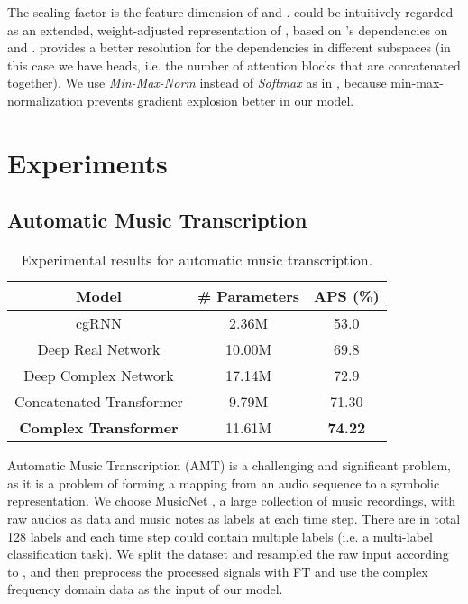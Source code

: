 \documentclass{article}
\begin{document}
The scaling factor  is the feature dimension of  and .  could be intuitively regarded as an extended, weight-adjusted representation of , based on 's dependencies on  and .   provides a better resolution for the dependencies in different subspaces \cite{tsaikernel} (in this case we have  heads, i.e. the number of attention blocks that are concatenated together). We use \textit{Min-Max-Norm} instead of \textit{Softmax} as in \cite{vaswani2017attention}, because min-max-normalization prevents gradient explosion better in our model.

\section{Experiments}

\subsection{Automatic Music Transcription}

\begin{table}
\centering
\caption{Experimental results for automatic music transcription.}
\begin{tabular}{c c c}
\toprule
 Model & \# Parameters & APS (\%)  \\
\midrule
cgRNN \cite{wolter2018complex} & 2.36M & 53.0 \\
Deep Real Network \cite{trabelsi2017deep} & 10.00M & 69.8 \\
Deep Complex Network \cite{trabelsi2017deep} & 17.14M & 72.9 \\
Concatenated Transformer & 9.79M & 71.30 \\
\textbf{Complex Transformer} & 11.61M & \textbf{74.22} \\
\bottomrule
\end{tabular}
\label{tab:result_music}
\end{table}

Automatic Music Transcription (AMT) is a challenging and significant problem, as it is a problem of forming a mapping from an audio sequence to a symbolic representation. We choose MusicNet \cite{thickstun2016learning}, a large collection of music recordings, with raw audios as data and music notes as labels at each time step. There are in total 128 labels and each time step could contain multiple labels (i.e. a multi-label classification task). We split the dataset and resampled the raw input according to \cite{trabelsi2017deep}, and then preprocess the processed signals with FT and use the complex frequency domain data as the input of our model. 
\end{document}
